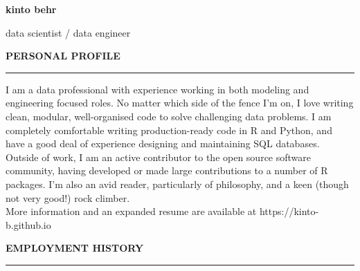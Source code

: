\documentclass[10pt]{article}
\begin{document}
\lsstyle

\pagecolor{skyblue}

\newcommand{\stub}{\textcolor{skyblue}{\rule{3cm}{3mm}}}

\begin{huge}\begin{center}{\bf kinto behr}\end{center}\end{huge}
\begin{Large}\begin{center}{data scientist / data engineer}\end{center}\end{Large}
\vspace{1cm}

\begin{large}
{\bf PERSONAL PROFILE} \\
\textcolor{gray}{\rule{2cm}{2mm}}
\end{large}
\vspace{5pt}

\begin{small}
  I am a data professional with experience working in both modeling and engineering focused roles. No matter
  which side of the fence I'm on, I love writing clean, modular, well-organised code to solve challenging
  data problems. I am completely comfortable writing production-ready code in R and Python, and have a good deal 
  of experience designing and maintaining SQL databases. \\

  Outside of work, I am an active contributor to the open source software community, having
  developed or made large contributions to a number of R packages. I'm also an avid reader, particularly of 
  philosophy, and a keen (though not very good!) rock climber. \\
  
  More information and an expanded resume are available at https://kinto-b.github.io
\end{small}

\vspace{1cm}
\begin{large}
{\bf EMPLOYMENT HISTORY} \\
\textcolor{gray}{\rule{2cm}{2mm}}
\end{large}
\vspace{5pt}
\end{document}
